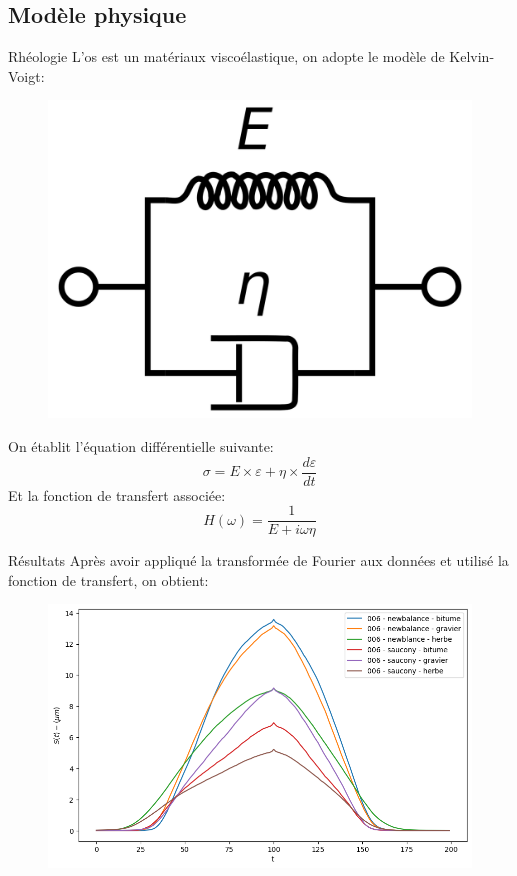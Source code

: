 \subsection{Modèle physique}
\begin{frame}{Rhéologie}
    L'os est un matériaux viscoélastique, on adopte le modèle de Kelvin-Voigt:
    \begin{figure}
        \includegraphics[scale=0.1]{./figures/rheo_00.png}
    \end{figure}
    On établit l'équation différentielle suivante:
    $$ \sigma = E \times \varepsilon + \eta \times \frac{d\varepsilon}{dt}$$
    Et la fonction de transfert associée:
    $$ H(\omega) = \frac{1}{E+i\omega\eta}$$
\end{frame}
\begin{frame}{Résultats}
    Après avoir appliqué la transformée de Fourier aux données et utilisé la fonction de transfert, on obtient:
    \begin{figure}
        \includegraphics[scale=0.5]{./figures/rheo_05.png}
    \end{figure}
\end{frame}
